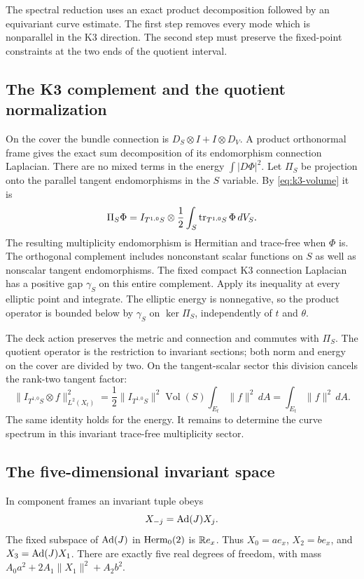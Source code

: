 The spectral reduction uses an exact product decomposition followed by
an equivariant curve estimate. The first step removes every mode which
is nonparallel in the K3 direction. The second step must preserve the
fixed-point constraints at the two ends of the quotient interval.

\subsection{The K3 complement and the quotient normalization}
On the cover the bundle connection is
$D_S\otimes I+I\otimes D_V$. A product orthonormal frame gives the
exact sum decomposition of its endomorphism connection Laplacian.
There are no mixed terms in the energy $\int|D\Phi|^2$.
Let $\Pi_S$ be projection onto the parallel tangent endomorphisms in
the $S$ variable. By \eqref{eq:k3-volume} it is
\begin{equation}\label{eq:k3-projection}
 \Pi_S\Phi=I_{T^{1,0}S}\otimes
 \frac12\int_S\operatorname{tr}_{T^{1,0}S}\Phi\,dV_S.
\end{equation}
The resulting multiplicity endomorphism is Hermitian and trace-free
when $\Phi$ is. The orthogonal complement includes nonconstant scalar
functions on $S$ as well as nonscalar tangent endomorphisms.
The fixed compact K3 connection Laplacian has a positive gap $\gamma_S$
on this entire complement. Apply its inequality at every elliptic point
and integrate. The elliptic energy is nonnegative, so the product
operator is bounded below by $\gamma_S$ on $\ker\Pi_S$, independently
of $t$ and $\theta$.

The deck action preserves the metric and connection and commutes with
$\Pi_S$. The quotient operator is the restriction to invariant sections;
both norm and energy on the cover are divided by two. On the tangent-scalar
sector this division cancels the rank-two tangent factor:
\begin{equation}\label{eq:norm-cancellation}
 \|I_{T^{1,0}S}\otimes f\|_{L^2(X_t)}^2
 =\frac12\|I_{T^{1,0}S}\|^2\operatorname{Vol}(S)
       \int_{E_t}\|f\|^2\,dA
 =\int_{E_t}\|f\|^2\,dA.
\end{equation}
The same identity holds for the energy. It remains to determine the
curve spectrum in this invariant trace-free multiplicity sector.

\subsection{The five-dimensional invariant space}
In component frames an invariant tuple obeys
\begin{equation}\label{eq:linear-invariance}
 X_{-j}=\operatorname{Ad}(J)X_j.
\end{equation}
The fixed subspace of $\operatorname{Ad}(J)$ in $\operatorname{Herm}_0(2)$ is $\mathbb R e_x$.
Thus $X_0=ae_x$, $X_2=be_x$, and $X_3=\operatorname{Ad}(J)X_1$.
There are exactly five real degrees of freedom, with mass
$A_0a^2+2A_1\|X_1\|^2+A_2b^2$.

